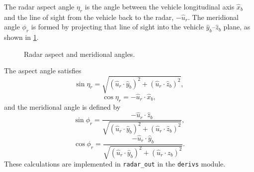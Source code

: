 The radar aspect angle $\eta_r$ is the angle between the vehicle longitudinal axis
$\hat x_b$ and the line of sight from the vehicle back to the radar, $-\hat u_r$.
The meridional angle $\phi_r$ is formed by projecting that line of sight into the
vehicle $\hat y_b$--$\hat z_b$ plane, as shown in
\cref{fig:radar-aspect-meridional}.

\begin{figure}[htbp]
  \centering
  \resizebox{0.84\linewidth}{!}{}
  \caption{Radar aspect and meridional angles.}
  \label{fig:radar-aspect-meridional}
\end{figure}

The aspect angle satisfies
\begin{equation}
  \sin\eta_r
  =\sqrt{(\hat u_r\cdot\hat y_b)^2+(\hat u_r\cdot\hat z_b)^2},
  \label{eq:radar-aspect-sine}
\end{equation}
\begin{equation}
  \cos\eta_r=-\hat u_r\cdot\hat x_b,
  \label{eq:radar-aspect-cosine}
\end{equation}
and the meridional angle is defined by
\begin{equation}
  \sin\phi_r
  =\frac{-\hat u_r\cdot\hat z_b}
         {\sqrt{(\hat u_r\cdot\hat y_b)^2+(\hat u_r\cdot\hat z_b)^2}},
  \label{eq:radar-meridional-sine}
\end{equation}
\begin{equation}
  \cos\phi_r
  =\frac{-\hat u_r\cdot\hat y_b}
         {\sqrt{(\hat u_r\cdot\hat y_b)^2+(\hat u_r\cdot\hat z_b)^2}}.
  \label{eq:radar-meridional-cosine}
\end{equation}
These calculations are implemented in \texttt{radar\_out} in the
\texttt{derivs} module.
